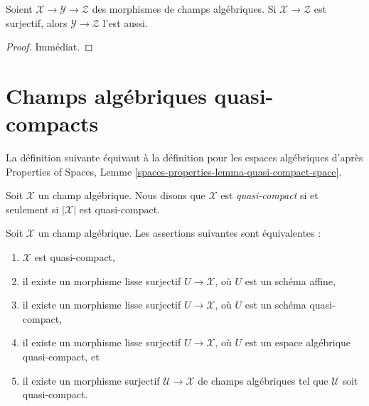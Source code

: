 \begin{lemma}
\label{lemma-surjective-permanence}
Soient $\mathcal{X} \to \mathcal{Y} \to \mathcal{Z}$ des morphismes de
champs algébriques. Si $\mathcal{X} \to \mathcal{Z}$ est surjectif,
alors $\mathcal{Y} \to \mathcal{Z}$ l'est aussi.
\end{lemma}

\begin{proof}
Immédiat.
\end{proof}












\section{Champs algébriques quasi-compacts}
\label{section-quasi-compact}

\noindent
La définition suivante équivaut à la définition pour les espaces
algébriques d'après
Properties of Spaces, Lemme \ref{spaces-properties-lemma-quasi-compact-space}.

\begin{definition}
\label{definition-quasi-compact}
Soit $\mathcal{X}$ un champ algébrique.
Nous disons que $\mathcal{X}$ est {\it quasi-compact}
si et seulement si $|\mathcal{X}|$ est quasi-compact.
\end{definition}

\begin{lemma}
\label{lemma-quasi-compact-stack}
Soit $\mathcal{X}$ un champ algébrique.
Les assertions suivantes sont équivalentes :
\begin{enumerate}
\item $\mathcal{X}$ est quasi-compact,
\item il existe un morphisme lisse surjectif $U \to \mathcal{X}$,
où $U$ est un schéma affine,
\item il existe un morphisme lisse surjectif $U \to \mathcal{X}$,
où $U$ est un schéma quasi-compact,
\item il existe un morphisme lisse surjectif $U \to \mathcal{X}$,
où $U$ est un espace algébrique quasi-compact, et
\item il existe un morphisme surjectif $\mathcal{U} \to \mathcal{X}$
de champs algébriques tel que $\mathcal{U}$ soit quasi-compact.
\end{enumerate}
\end{lemma}

